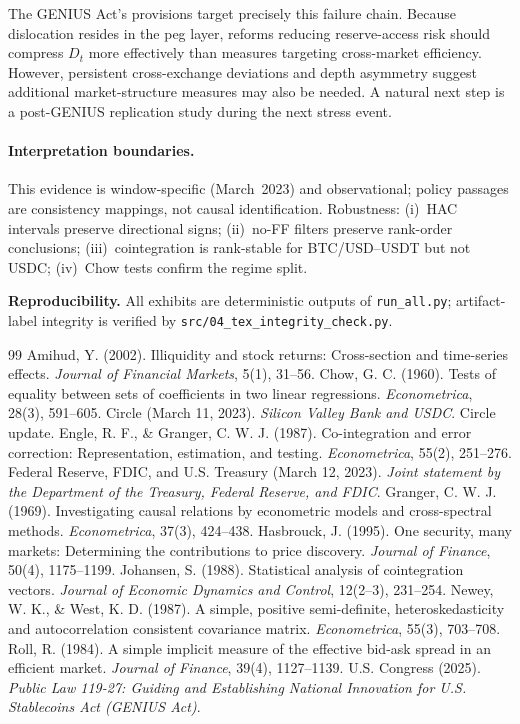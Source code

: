 \documentclass[12pt]{article}
\begin{document}
The GENIUS Act's provisions target precisely this failure chain. Because dislocation resides in the peg layer, reforms reducing reserve-access risk should compress $D_t$ more effectively than measures targeting cross-market efficiency. However, persistent cross-exchange deviations and depth asymmetry suggest additional market-structure measures may also be needed. A natural next step is a post-GENIUS replication study during the next stress event.

\paragraph{Interpretation boundaries.} This evidence is window-specific (March~2023) and observational; policy passages are consistency mappings, not causal identification.
Robustness: (i)~HAC intervals preserve directional signs; (ii)~no-FF filters preserve rank-order conclusions; (iii)~cointegration is rank-stable for BTC/USD--USDT but not USDC; (iv)~Chow tests confirm the regime split.

\smallskip\noindent\textbf{Reproducibility.}
All exhibits are deterministic outputs of \texttt{run\_all.py}; artifact-label integrity is verified by \texttt{src/04\_tex\_integrity\_check.py}.

\small
\begin{thebibliography}{99}
 Amihud, Y. (2002). Illiquidity and stock returns: Cross-section and time-series effects. \emph{Journal of Financial Markets}, 5(1), 31--56.
 Chow, G. C. (1960). Tests of equality between sets of coefficients in two linear regressions. \emph{Econometrica}, 28(3), 591--605.
 Circle (March 11, 2023). \emph{Silicon Valley Bank and USDC}. Circle update.
 Engle, R. F., \& Granger, C. W. J. (1987). Co-integration and error correction: Representation, estimation, and testing. \emph{Econometrica}, 55(2), 251--276.
 Federal Reserve, FDIC, and U.S. Treasury (March 12, 2023). \emph{Joint statement by the Department of the Treasury, Federal Reserve, and FDIC}.
 Granger, C. W. J. (1969). Investigating causal relations by econometric models and cross-spectral methods. \emph{Econometrica}, 37(3), 424--438.
 Hasbrouck, J. (1995). One security, many markets: Determining the contributions to price discovery. \emph{Journal of Finance}, 50(4), 1175--1199.
 Johansen, S. (1988). Statistical analysis of cointegration vectors. \emph{Journal of Economic Dynamics and Control}, 12(2--3), 231--254.
 Newey, W. K., \& West, K. D. (1987). A simple, positive semi-definite, heteroskedasticity and autocorrelation consistent covariance matrix. \emph{Econometrica}, 55(3), 703--708.
 Roll, R. (1984). A simple implicit measure of the effective bid-ask spread in an efficient market. \emph{Journal of Finance}, 39(4), 1127--1139.
 U.S. Congress (2025). \emph{Public Law 119-27: Guiding and Establishing National Innovation for U.S. Stablecoins Act (GENIUS Act)}.
\end{thebibliography}
\end{document}
